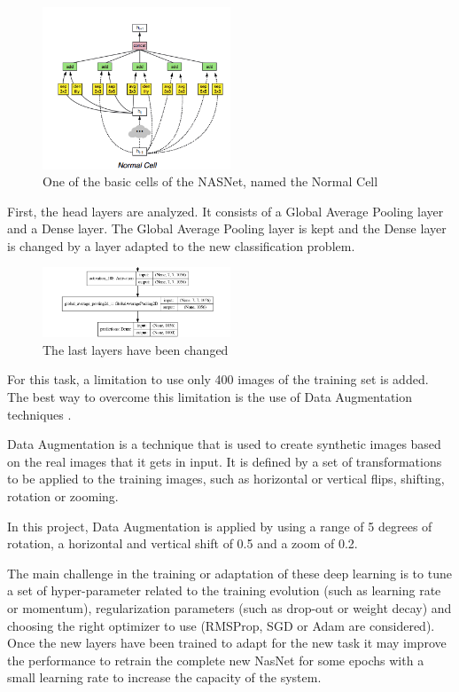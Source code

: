 \documentclass[runningheads]{llncs}
\begin{document}
\begin{figure}[ht!]
  \centering
  \includegraphics[width=0.5\textwidth]{NasNet.png}\hfill
  \caption{One of the basic cells of the NASNet, named the Normal Cell}
\end{figure}

First, the head layers are analyzed. It consists of a Global Average Pooling layer and a Dense layer. The Global Average Pooling layer is kept and the Dense layer is changed by a layer adapted to the new classification problem.

\begin{figure}[ht!]
  \centering
  \includegraphics[width=0.5\textwidth]{last-layers.png}\hfill
  \caption{The last layers have been changed}
\end{figure}

For this task, a limitation to use only 400 images of the training set is added. The best way to overcome this limitation is the use of Data Augmentation techniques .

Data Augmentation is a technique that is used to create synthetic images based on the real images that it gets in input. It is defined by a set of transformations to be applied to the training images, such as horizontal or vertical flips, shifting, rotation or zooming.

In this project, Data Augmentation is applied by using a range of 5 degrees of rotation, a horizontal and vertical shift of 0.5 and a zoom of 0.2.

The main challenge in the training or adaptation of these deep learning is to tune a set of hyper-parameter related to the training evolution (such as learning rate or momentum), regularization parameters (such as drop-out or weight decay) and choosing the right optimizer to use (RMSProp, SGD or Adam are considered). Once the new layers have been trained to adapt for the new task it may improve the performance to retrain the complete new NasNet for some epochs with a small learning rate to increase the capacity of the system.
\end{document}
